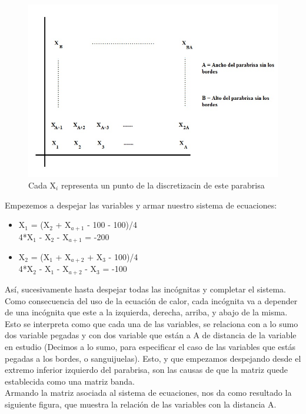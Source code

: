     \begin{figure}[H]
    \centering
    \includegraphics[scale=0.7]{graphs/mapa.jpg}\caption{Cada X$_i$ representa un punto de la discretizacin de este parabrisa}
      \end{figure}
      
      
      
Empezemos a despejar las variables y armar nuestro sistema de ecuaciones:\\
    \begin{itemize}
    \item  X$_1$ = (X$_2$ + X$_{a+1}$ - 100 - 100)/4\\
            4*X$_1$ - X$_2$ - X$_{a+1}$ = -200 
            
    \item X$_2$ = (X$_1$ + X$_{a+2}$ + X$_3$ - 100)/4\\
            4*X$_2$ - X$_1$ - X$_{a+2}$ - X$_3$ = -100 
    
    \end{itemize}
    
    Así, sucesivamente hasta despejar todas las incógnitas y completar el sistema. Como consecuencia del uso de la ecuación de calor, cada incógnita va a depender de una incógnita que este a la izquierda, derecha, arriba, y abajo de la misma. Esto se interpreta como que cada una de las variables, se relaciona con a lo sumo dos variable pegadas y con dos variable que están a A de distancia de la variable en estudio (Decimos a lo sumo, para especificar el caso de las variables que estás pegadas a los bordes, o sanguijuelas). Esto, y que empezamos despejando desde el extremo inferior izquierdo del parabrisa, son las causas de que la matriz quede establecida como una matriz banda.\\
    Armando la matriz asociada al sistema de ecuaciones, nos da como resultado la siguiente figura, que muestra la relación de las variables con la distancia A.
    
